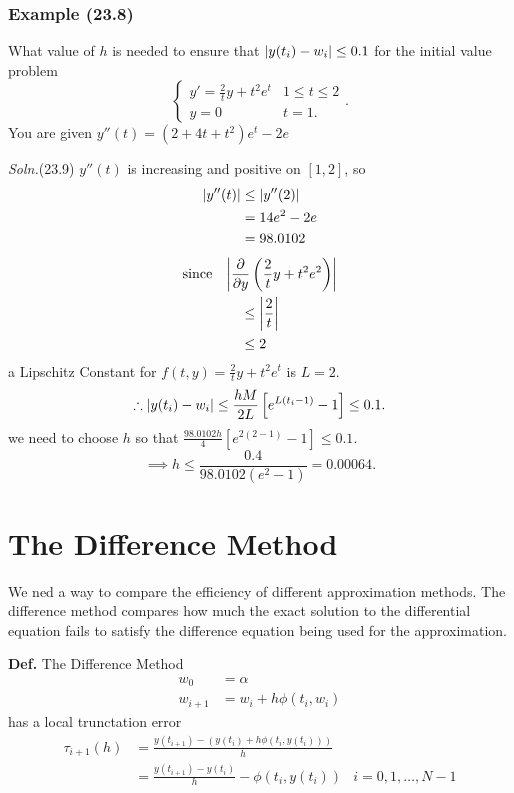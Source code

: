 \documentclass[12pt]{article}
\newcommand{\defn}{\textbf{Def.}\xspace}
\newcommand{\soln}{\textit{Soln.}\xspace}
\begin{document}
\subsubsection{Example (23.8)}
What value of $h$ is needed to ensure that $\abs{y(t_i) - w_i} \leq 0.1$ for the
initial value problem
\[
  \begin{cases}
    y' = \frac{2}{t} y + t^2 e^t & 1 \leq t \leq 2 \\
    y = 0 & t = 1
  .\end{cases}
.\]
You are given $y''(t) = (2+4t+t^2)e^t - 2e$

\soln (23.9) $y''(t)$ is increasing and positive on $[1,2]$, so
\begin{align*}
  \abs{y''(t)} &\leq \abs{y''(2)} \\
  &= 14e^2 - 2e \\
  &= 98.0102 \\
\end{align*}
\begin{align*}
  \text{since}\quad & \abs{\frac{\partial}{\partial y} \left(\frac{2}{t}y +
  t^2e^2\right)} \\
                &\quad\leq \abs{\frac{2}{t}} \\
                &\quad\leq 2 \\
\end{align*}
a Lipschitz Constant for $f(t,y) = \frac{2}{t}y+t^2e^t$ is $L = 2$.
\[
\therefore \abs{y(t_i) - w_i} \leq \frac{hM}{2L}\left[e^{L(t_i-1)}-1\right] \leq
0.1
.\]
we need to choose $h$ so that $\displaystyle \frac{98.0102h}{4}
\left[e^{2(2-1)}-1 \right] \leq 0.1$.
\[
\implies h \leq \frac{0.4}{98.0102(e^2-1)} = 0.00064
.\]

\section{The Difference Method}
We ned a way to compare the efficiency of different approximation methods. The
difference method compares how much the exact solution to the differential
equation fails to satisfy the difference equation being used for the approximation.

\defn The Difference Method
\begin{align*}
  w_0 &= \alpha \\
  w_{i+1} &= w_i + h \phi (t_i, w_i)
\end{align*}
has a local trunctation error 
\begin{align*}
  \tau_{i+1}(h) &= \frac{y(t_{i+1}) - (y(t_i) + h \phi (t_i, y(t_i)))}{h} \\
                &= \frac{y(t_{i+1}) - y(t_i)}{h} - \phi(t_i, y(t_i)) 
                & i = 0, 1, \dots, N-1
\end{align*}
\end{document}
